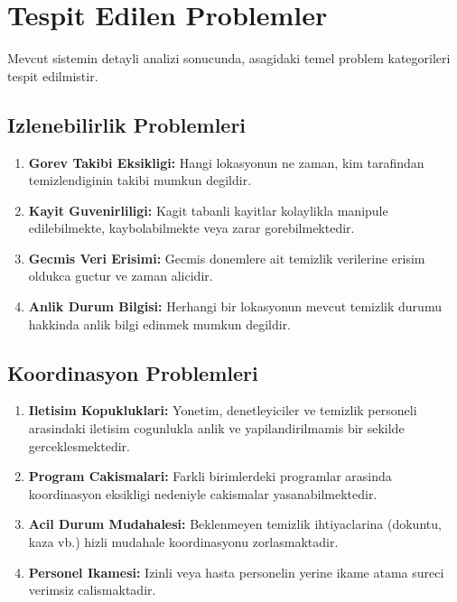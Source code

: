 \section{Tespit Edilen Problemler}
\label{sec:problemler}

Mevcut sistemin detayli analizi sonucunda, asagidaki temel 
problem kategorileri tespit edilmistir.

\subsection{Izlenebilirlik Problemleri}
\label{subsec:izlenebilirlik-problemleri}

\begin{enumerate}
    \item \textbf{Gorev Takibi Eksikligi:} Hangi lokasyonun ne zaman, 
    kim tarafindan temizlendiginin takibi mumkun degildir.
    
    \item \textbf{Kayit Guvenirliligi:} Kagit tabanli kayitlar 
    kolaylikla manipule edilebilmekte, kaybolabilmekte veya 
    zarar gorebilmektedir.
    
    \item \textbf{Gecmis Veri Erisimi:} Gecmis donemlere ait temizlik 
    verilerine erisim oldukca guctur ve zaman alicidir.
    
    \item \textbf{Anlik Durum Bilgisi:} Herhangi bir lokasyonun mevcut 
    temizlik durumu hakkinda anlik bilgi edinmek mumkun degildir.
\end{enumerate}

\subsection{Koordinasyon Problemleri}
\label{subsec:koordinasyon-problemleri}

\begin{enumerate}
    \item \textbf{Iletisim Kopukluklari:} Yonetim, denetleyiciler ve 
    temizlik personeli arasindaki iletisim cogunlukla anlik ve 
    yapilandirilmamis bir sekilde gerceklesmektedir.
    
    \item \textbf{Program Cakismalari:} Farkli birimlerdeki programlar 
    arasinda koordinasyon eksikligi nedeniyle cakismalar 
    yasanabilmektedir.
    
    \item \textbf{Acil Durum Mudahalesi:} Beklenmeyen temizlik 
    ihtiyaclarina (dokuntu, kaza vb.) hizli mudahale koordinasyonu 
    zorlasmaktadir.
    
    \item \textbf{Personel Ikamesi:} Izinli veya hasta personelin 
    yerine ikame atama sureci verimsiz calismaktadir.
\end{enumerate}

